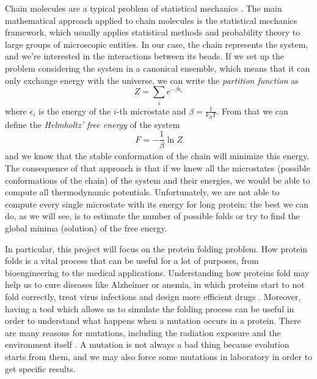 Chain molecules are a typical problem of statistical mechanics \cite{statisticalmechanics}.
The main mathematical approach applied to chain molecules is the statistical mechanics framework, which usually applies statistical methods and probability theory to large groups of microscopic entities.
In our case, the chain represents the system, and we're interested in the interactions between its beads.
If we set up the problem considering the system in a canonical ensemble, which means that it can only exchange energy with the universe, we can write the \emph{partition function} as
\begin{equation*}
    Z = \sum_i e^{-\beta\epsilon_i}
\end{equation*}
where $\epsilon_i$ is the energy of the $i$-th microstate and $\beta = \frac{1}{k_BT}$.
From that we can define the \emph{Helmholtz' free energy} of the system
\begin{equation*}
    F = -\frac{1}{\beta} \ln Z
\end{equation*}
and we know that the stable conformation of the chain will minimize this energy.
The consequence of that approach is that if we knew all the microstates (possible conformations of the chain) of the system and their energies, we would be able to compute all thermodynamic potentials.
Unfortunately, we are not able to compute every single microstate with its energy for long protein: the best we can do, as we will see, is to estimate the number of possible folds or try to find the global minima (solution) of the free energy.

In particular, this project will focus on the protein folding problem.
How protein folds is a vital process that can be useful for a lot of purposes, from bioengineering to the medical applications.
Understanding how proteins fold may help us to cure diseases like Alzheimer or anemia, in which proteins start to not fold correctly, treat virus infections and design more efficient drugs \cite{PERM}. 
Moreover, having a tool which allows us to simulate the folding process can be useful in order to understand what happens when a mutation occurs in a protein.
There are many reasons for mutations, including the radiation exposure and the environment itself \cite{zanichelli}. A mutation is not always a bad thing because evolution starts from them, and we may also force some mutations in laboratory in order to get specific results.

